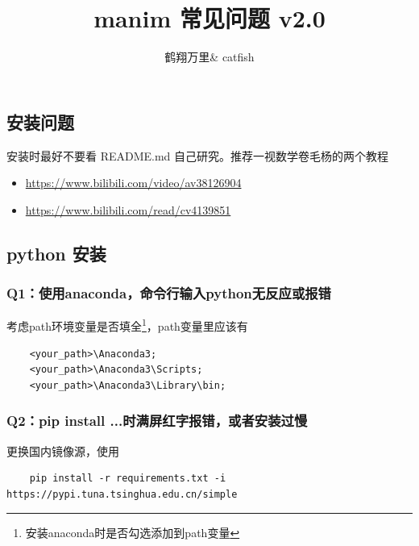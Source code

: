 \documentclass[a4paper]{article}
\begin{document}
\title{manim 常见问题 v2.0}
\author{鹤翔万里\& catfish}

\maketitle

\newpage

\begin{center}
    \tableofcontents
\end{center} 

\newpage

\begin{center}
    \section{安装问题}
\end{center}
安装时最好不要看 README.md 自己研究。推荐一视数学卷毛杨的两个教程
\begin{itemize}
    \item \url{https://www.bilibili.com/video/av38126904}
    \item \url{https://www.bilibili.com/read/cv4139851}
\end{itemize}

\subsection{python 安装}
\subsubsection*{Q1：使用anaconda，命令行输入python无反应或报错}

考虑path环境变量是否填全\footnote{安装anaconda时是否勾选添加到path变量}，path变量里应该有

\begin{verbatim}
    <your_path>\Anaconda3;
    <your_path>\Anaconda3\Scripts;
    <your_path>\Anaconda3\Library\bin;
\end{verbatim}

\subsubsection*{Q2：pip install ...时满屏红字报错，或者安装过慢}

更换国内镜像源，使用 
\begin{verbatim}
    pip install -r requirements.txt -i https://pypi.tuna.tsinghua.edu.cn/simple
\end{verbatim}
\end{document}
